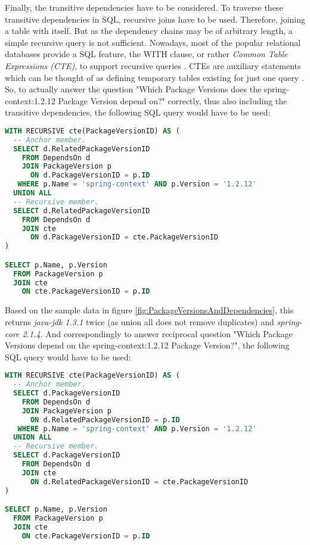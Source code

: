 Finally, the transitive dependencies have to be considered. To traverse these transitive dependencies in SQL, recursive joins have to be used. Therefore, joining a table with itself. But as the dependency chains may be of arbitrary length, a simple recursive query is not sufficient. Nowadays, most of the popular relational databases provide a SQL feature, the WITH clause, or rather \emph{Common Table Expressions (CTE)}, to support recursive queries \cite{mysqlCTE, postgresCTE, sqliteCTE}. CTEs are auxiliary statements which can be thought of as defining temporary tables existing for just one query \cite{postgresCTE}. So, to actually answer the question "Which Package Versions does the spring-context:1.2.12 Package Version depend on?" correctly, thus also including the transitive dependencies, the following SQL query would have to be used:

\begin{lstlisting}[language=SQL, caption=Package Version Dependencies (including transitive), captionpos=b, label=lst:PackageVersionDependenciesIncTransitive]
WITH RECURSIVE cte(PackageVersionID) AS (
  -- Anchor member.
  SELECT d.RelatedPackageVersionID
    FROM DependsOn d
    JOIN PackageVersion p
      ON d.PackageVersionID = p.ID
   WHERE p.Name = 'spring-context' AND p.Version = '1.2.12'
  UNION ALL
  -- Recursive member.
  SELECT d.RelatedPackageVersionID
    FROM DependsOn d
    JOIN cte
      ON d.PackageVersionID = cte.PackageVersionID
)

SELECT p.Name, p.Version
  FROM PackageVersion p
  JOIN cte
    ON cte.PackageVersionID = p.ID
\end{lstlisting}

Based on the sample data in figure \ref{fig:PackageVersionsAndDependencies}, this returns \emph{java-jdk 1.3.1} twice (as union all does not remove duplicates) and \emph{spring-core 2.1.4}. And correspondingly to answer reciprocal question "Which Package Versions depend on the spring-context:1.2.12 Package Version?", the following SQL query would have to be used:

\begin{lstlisting}[language=SQL, caption=Package Version Reciprocal Dependencies (including transitive), captionpos=b, label=lst:PackageVersionReciprocalDependenciesIncTransitive]
WITH RECURSIVE cte(PackageVersionID) AS (
  -- Anchor member.
  SELECT d.PackageVersionID
    FROM DependsOn d
    JOIN PackageVersion p
      ON d.RelatedPackageVersionID = p.ID
   WHERE p.Name = 'spring-context' AND p.Version = '1.2.12'
  UNION ALL
  -- Recursive member.
  SELECT d.PackageVersionID
    FROM DependsOn d
    JOIN cte
      ON d.RelatedPackageVersionID = cte.PackageVersionID
)

SELECT p.Name, p.Version
  FROM PackageVersion p
  JOIN cte
    ON cte.PackageVersionID = p.ID
\end{lstlisting}

